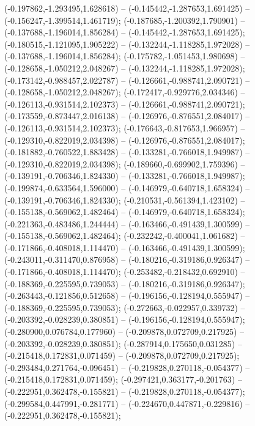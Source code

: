  (-0.197862,-1.293495,1.628618) -- (-0.145442,-1.287653,1.691425) -- (-0.156247,-1.399514,1.461719);
 (-0.187685,-1.200392,1.790901) -- (-0.137688,-1.196014,1.856284) -- (-0.145442,-1.287653,1.691425);
 (-0.180515,-1.121095,1.905222) -- (-0.132244,-1.118285,1.972028) -- (-0.137688,-1.196014,1.856284);
 (-0.175782,-1.051453,1.980698) -- (-0.128658,-1.050212,2.048267) -- (-0.132244,-1.118285,1.972028);
 (-0.173142,-0.988457,2.022787) -- (-0.126661,-0.988741,2.090721) -- (-0.128658,-1.050212,2.048267);
 (-0.172417,-0.929776,2.034346) -- (-0.126113,-0.931514,2.102373) -- (-0.126661,-0.988741,2.090721);
 (-0.173559,-0.873447,2.016138) -- (-0.126976,-0.876551,2.084017) -- (-0.126113,-0.931514,2.102373);
 (-0.176643,-0.817653,1.966957) -- (-0.129310,-0.822019,2.034398) -- (-0.126976,-0.876551,2.084017);
 (-0.181882,-0.760522,1.883428) -- (-0.133281,-0.766018,1.949987) -- (-0.129310,-0.822019,2.034398);
 (-0.189660,-0.699902,1.759396) -- (-0.139191,-0.706346,1.824330) -- (-0.133281,-0.766018,1.949987);
 (-0.199874,-0.633564,1.596000) -- (-0.146979,-0.640718,1.658324) -- (-0.139191,-0.706346,1.824330);
 (-0.210531,-0.561394,1.423102) -- (-0.155138,-0.569062,1.482464) -- (-0.146979,-0.640718,1.658324);
 (-0.221363,-0.483486,1.244444) -- (-0.163466,-0.491439,1.300599) -- (-0.155138,-0.569062,1.482464);
 (-0.232242,-0.400041,1.061682) -- (-0.171866,-0.408018,1.114470) -- (-0.163466,-0.491439,1.300599);
 (-0.243011,-0.311470,0.876958) -- (-0.180216,-0.319186,0.926347) -- (-0.171866,-0.408018,1.114470);
 (-0.253482,-0.218432,0.692910) -- (-0.188369,-0.225595,0.739053) -- (-0.180216,-0.319186,0.926347);
 (-0.263443,-0.121856,0.512658) -- (-0.196156,-0.128194,0.555947) -- (-0.188369,-0.225595,0.739053);
 (-0.272663,-0.022957,0.339732) -- (-0.203392,-0.028239,0.380851) -- (-0.196156,-0.128194,0.555947);
 (-0.280900,0.076784,0.177960) -- (-0.209878,0.072709,0.217925) -- (-0.203392,-0.028239,0.380851);
 (-0.287914,0.175650,0.031285) -- (-0.215418,0.172831,0.071459) -- (-0.209878,0.072709,0.217925);
 (-0.293484,0.271764,-0.096451) -- (-0.219828,0.270118,-0.054377) -- (-0.215418,0.172831,0.071459);
 (-0.297421,0.363177,-0.201763) -- (-0.222951,0.362478,-0.155821) -- (-0.219828,0.270118,-0.054377);
 (-0.299584,0.447991,-0.281771) -- (-0.224670,0.447871,-0.229816) -- (-0.222951,0.362478,-0.155821);
